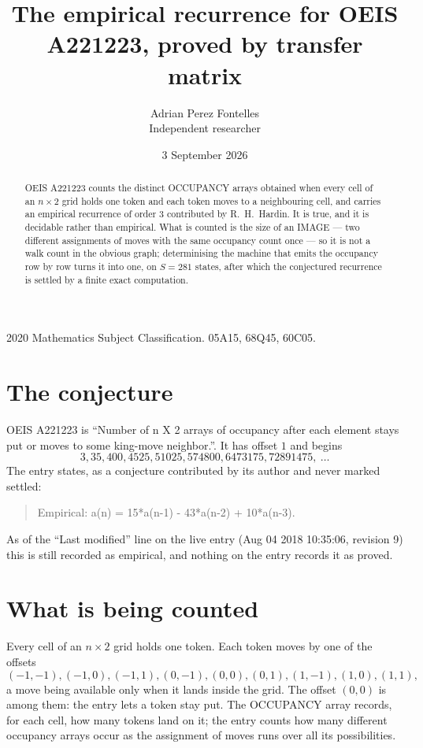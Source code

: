 \documentclass[11pt,a4paper]{article}
\title{The empirical recurrence for OEIS A221223, proved by transfer matrix}
\author{Adrian Perez Fontelles\\ \small Independent researcher}
\date{3 September 2026}
\theoremstyle{plain}
\theoremstyle{definition}
\begin{document}
\maketitle

\begin{abstract}
OEIS A221223 counts the distinct OCCUPANCY arrays obtained when every cell of an $n\times2$ grid
holds one token and each token moves to a neighbouring cell, and carries an empirical
recurrence of order $3$ contributed by R.~H.~Hardin. It is true, and it is decidable
rather than empirical. What is counted is the size of an IMAGE --- two different assignments of
moves with the same occupancy count once --- so it is not a walk count in the obvious graph;
determinising the machine that emits the occupancy row by row turns it into one, on $S=281$
states, after which the conjectured recurrence is settled by a finite exact computation.
\end{abstract}

\noindent\small 2020 Mathematics Subject Classification. 05A15, 68Q45, 60C05.\normalsize

\section{The conjecture}

OEIS A221223 is ``Number of n X 2 arrays of occupancy after each element stays put or moves to some king-move neighbor.''. It has offset $1$ and begins
\[
3, 35, 400, 4525, 51025, 574800, 6473175, 72891475,\ \dots
\]
The entry states, as a conjecture contributed by its author and never marked settled:
\begin{quote}
Empirical: a(n) = 15*a(n-1) - 43*a(n-2) + 10*a(n-3).
\end{quote}
As of the ``Last modified'' line on the live entry (Aug 04 2018 10:35:06, revision 9) this is still
recorded as empirical, and nothing on the entry records it as proved.

\section{What is being counted}

Every cell of an $n\times2$ grid holds one token. Each token moves by one of the offsets
\[
(-1,-1), (-1,0), (-1,1), (0,-1), (0,0), (0,1), (1,-1), (1,0), (1,1),
\]
a move being available only when it lands inside the grid. The offset $(0,0)$ is among them: the entry lets a token stay put. The OCCUPANCY array
records, for each cell, how many tokens land on it; the entry counts how many different
occupancy arrays occur as the assignment of moves runs over all its possibilities.
\end{document}
